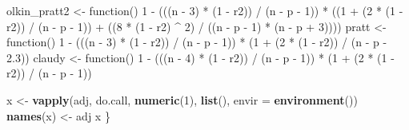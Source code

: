\documentclass[]{article}
\newenvironment{Shaded}{\begin{snugshade}}{\end{snugshade}}
\newcommand{\KeywordTok}[1]{\textcolor[rgb]{0.13,0.29,0.53}{\textbf{{#1}}}}
\newcommand{\DataTypeTok}[1]{\textcolor[rgb]{0.13,0.29,0.53}{{#1}}}
\newcommand{\DecValTok}[1]{\textcolor[rgb]{0.00,0.00,0.81}{{#1}}}
\newcommand{\FloatTok}[1]{\textcolor[rgb]{0.00,0.00,0.81}{{#1}}}
\newcommand{\StringTok}[1]{\textcolor[rgb]{0.31,0.60,0.02}{{#1}}}
\newcommand{\NormalTok}[1]{{#1}}
\begin{document}
\begin{Shaded}
\begin{Highlighting}[]
  \NormalTok{olkin_pratt2 <-}\StringTok{ }\NormalTok{function() }\DecValTok{1} \NormalTok{-}\StringTok{ }\NormalTok{(((n -}\StringTok{ }\DecValTok{3}\NormalTok{) *}\StringTok{ }\NormalTok{(}\DecValTok{1} \NormalTok{-}\StringTok{ }\NormalTok{r2)) /}\StringTok{ }\NormalTok{(n -}\StringTok{ }\NormalTok{p -}\StringTok{ }\DecValTok{1}\NormalTok{)) *}\StringTok{ }\NormalTok{((}\DecValTok{1} \NormalTok{+}\StringTok{ }\NormalTok{(}\DecValTok{2} \NormalTok{*}\StringTok{ }\NormalTok{(}\DecValTok{1} \NormalTok{-}\StringTok{ }\NormalTok{r2)) /}\StringTok{ }\NormalTok{(n -}\StringTok{ }\NormalTok{p -}\StringTok{ }\DecValTok{1}\NormalTok{)) +}\StringTok{ }
\StringTok{                                 }\NormalTok{((}\DecValTok{8} \NormalTok{*}\StringTok{ }\NormalTok{(}\DecValTok{1} \NormalTok{-}\StringTok{ }\NormalTok{r2) ^}\StringTok{ }\DecValTok{2}\NormalTok{)   /}\StringTok{ }\NormalTok{((n -}\StringTok{ }\NormalTok{p -}\StringTok{ }\DecValTok{1}\NormalTok{) *}\StringTok{  }\NormalTok{(n -}\StringTok{ }\NormalTok{p +}\StringTok{ }\DecValTok{3}\NormalTok{))))}
  \NormalTok{pratt        <-}\StringTok{ }\NormalTok{function() }\DecValTok{1} \NormalTok{-}\StringTok{ }\NormalTok{(((n -}\StringTok{ }\DecValTok{3}\NormalTok{) *}\StringTok{ }\NormalTok{(}\DecValTok{1} \NormalTok{-}\StringTok{ }\NormalTok{r2)) /}\StringTok{ }\NormalTok{(n -}\StringTok{ }\NormalTok{p -}\StringTok{ }\DecValTok{1}\NormalTok{)) *}\StringTok{  }\NormalTok{(}\DecValTok{1} \NormalTok{+}\StringTok{ }\NormalTok{(}\DecValTok{2} \NormalTok{*}\StringTok{ }\NormalTok{(}\DecValTok{1} \NormalTok{-}\StringTok{ }\NormalTok{r2)) /}\StringTok{ }\NormalTok{(n -}\StringTok{ }\NormalTok{p -}\StringTok{ }\FloatTok{2.3}\NormalTok{))}
  \NormalTok{claudy       <-}\StringTok{ }\NormalTok{function() }\DecValTok{1} \NormalTok{-}\StringTok{ }\NormalTok{(((n -}\StringTok{ }\DecValTok{4}\NormalTok{) *}\StringTok{ }\NormalTok{(}\DecValTok{1} \NormalTok{-}\StringTok{ }\NormalTok{r2)) /}\StringTok{ }\NormalTok{(n -}\StringTok{ }\NormalTok{p -}\StringTok{ }\DecValTok{1}\NormalTok{)) *}\StringTok{  }\NormalTok{(}\DecValTok{1} \NormalTok{+}\StringTok{ }\NormalTok{(}\DecValTok{2} \NormalTok{*}\StringTok{ }\NormalTok{(}\DecValTok{1} \NormalTok{-}\StringTok{ }\NormalTok{r2)) /}\StringTok{ }\NormalTok{(n -}\StringTok{ }\NormalTok{p -}\StringTok{ }\DecValTok{1}\NormalTok{))}
  
  \NormalTok{x <-}\StringTok{ }\KeywordTok{vapply}\NormalTok{(adj, do.call, }\KeywordTok{numeric}\NormalTok{(}\DecValTok{1}\NormalTok{), }\KeywordTok{list}\NormalTok{(), }\DataTypeTok{envir =} \KeywordTok{environment}\NormalTok{())}
  \KeywordTok{names}\NormalTok{(x) <-}\StringTok{ }\NormalTok{adj}
  \NormalTok{x}
\NormalTok{\}}


\end{Highlighting}
\end{Shaded}
\end{document}
